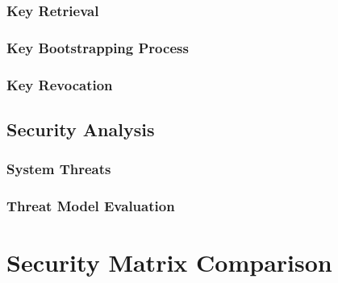 			\subsubsection{Key Retrieval}

			\subsubsection{Key Bootstrapping Process}

			\subsubsection{Key Revocation}

		\subsection{Security Analysis}

			\subsubsection{System Threats}

			\subsubsection{Threat Model Evaluation}

	\section{Security Matrix Comparison}


